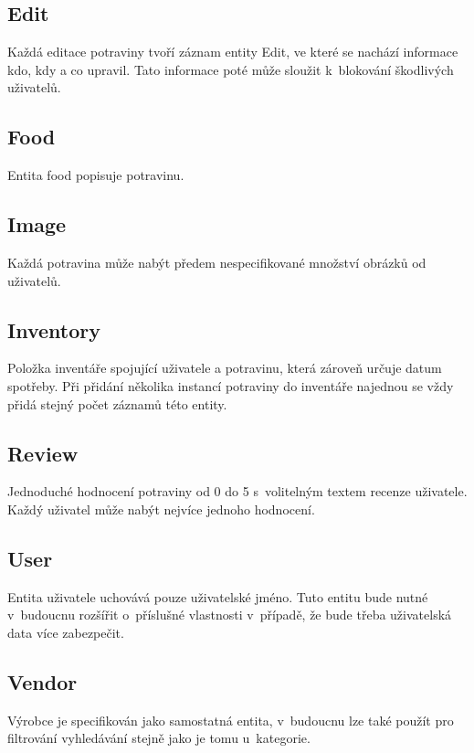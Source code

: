\documentclass[thesis=B,czech]{FITthesis}[2013/10/20]
\begin{document}
\subsection{Edit}
Každá editace potraviny tvoří záznam entity Edit, ve které se nachází informace kdo, kdy a co upravil. Tato informace poté může sloužit k~blokování škodlivých uživatelů.

\subsection{Food}
Entita food popisuje potravinu.

\subsection{Image}
Každá potravina může nabýt předem nespecifikované množství obrázků od uživatelů.

\subsection{Inventory}
Položka inventáře spojující uživatele a potravinu, která zároveň určuje datum spotřeby. Při přidání několika instancí potraviny do inventáře najednou se vždy přidá stejný počet záznamů této entity.

\subsection{Review}
Jednoduché hodnocení potraviny od 0 do 5 s~volitelným textem recenze uživatele. Každý uživatel může nabýt nejvíce jednoho hodnocení.

\subsection{User}
Entita uživatele uchovává pouze uživatelské jméno. Tuto entitu bude nutné v~budoucnu rozšířit o~příslušné vlastnosti v~případě, že bude třeba uživatelská data více zabezpečit.

\subsection{Vendor}
Výrobce je specifikován jako samostatná entita, v~budoucnu lze také použít pro filtrování vyhledávání stejně jako je tomu u~kategorie.
\end{document}
